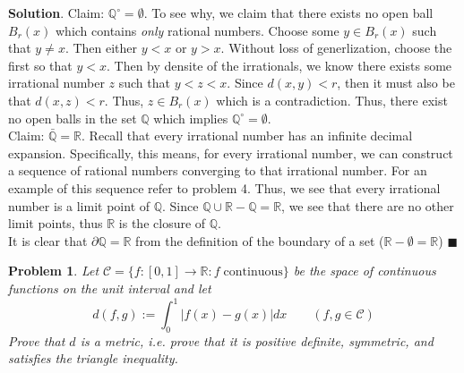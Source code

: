 \documentclass[12pt]{article}
\renewcommand{\=}[1]{\stackrel{#1}{=}} %
\newtheorem{p}{Problem}[section]
\theoremstyle{definition}
\newenvironment{s}{%
        \begin{trivlist} \item \textbf{Solution}. }{%
            \hspace*{\fill} $\blacksquare$\end{trivlist}}%
\begin{document}
\begin{s}
    Claim: $\mathbb{Q}^{\circ} = \emptyset$. To see why, we claim that there exists no open ball $B_r(x)$ which contains
    \textit{only} rational numbers. Choose some $y\in B_r(x)$ such that $y\neq x$. Then either $y<x$ or $y>x$. Without loss
    of generlization, choose the first so that $y<x$. Then by densite of the irrationals, we know there exists some irrational
    number $z$ such that $y < z < x$. Since $d(x,y) < r$, then it must also be that $d(x,z) < r$. Thus, $z\in B_r(x)$ which is
    a contradiction. Thus, there exist no open balls in the set $\mathbb{Q}$ which implies $\mathbb{Q}^{\circ} = \emptyset$.\\

    Claim: $\bar{\mathbb{Q}} = \mathbb{R}$. Recall that every irrational number has an infinite decimal expansion. Specifically,
    this means, for every irrational number, we can construct a sequence of rational numbers converging to that irrational number.
    For an example of this sequence refer to problem 4. Thus, we see that every irrational number is a limit point of $\mathbb{Q}$.
    Since $\mathbb{Q}\cup\mathbb{R}-\mathbb{Q} = \mathbb{R}$, we see that there are no other limit points, thus $\mathbb{R}$ is the
    closure of $\mathbb{Q}$.\\

    It is clear that $\partial{\mathbb{Q}} = \mathbb{R}$ from the definition of the boundary of a set ($\mathbb{R}-\emptyset =
    \mathbb{R}$)
\end{s}

\begin{p}
    Let $\mathcal{C} = \{f: [0,1]\to\mathbb{R}: f\;\text{continuous}\}$ be the space of continuous functions on the unit interval
    and let
    \[ d(f,g) := \int_0^1 |f(x) - g(x)|dx\qquad(f,g\in\mathcal{C}) \]
    Prove that $d$ is a metric, i.e. prove that it is positive definite, symmetric, and satisfies the triangle inequality.
\end{p}
\end{document}
